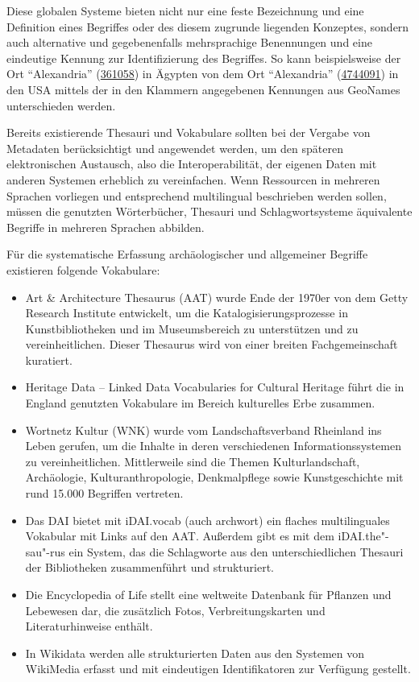 Diese globalen Systeme bieten nicht nur eine feste Bezeichnung und eine Definition eines Begriffes oder des diesem zugrunde liegenden Konzeptes, sondern auch alternative und gegebenenfalls mehrsprachige Benennungen und eine eindeutige Kennung zur Identifizierung des Begriffes. So kann beispielsweise der Ort "`Alexandria"' (\href{http://www.geonames.org/361058/alexandria.html}{361058}) in Ägypten von dem Ort "`Alexandria"' (\href{http://www.geonames.org/4744091/alexandria.html}{4744091}) in den USA mittels der in den Klammern angegebenen Kennungen aus GeoNames unterschieden werden.

Bereits existierende Thesauri und Vokabulare sollten bei der Vergabe von Metadaten berücksichtigt und angewendet werden, um den späteren elektronischen Austausch, also die Interoperabilität, der eigenen Daten mit anderen Systemen erheblich zu vereinfachen. Wenn Ressourcen in mehreren Sprachen vorliegen und entsprechend multilingual beschrieben werden sollen, müssen die genutzten Wörterbücher, Thesauri und Schlagwortsysteme äquivalente Begriffe in mehreren Sprachen abbilden.

Für die systematische Erfassung archäologischer und allgemeiner Begriffe existieren folgende Vokabulare:
\begin{itemize}
	\item Art \& Architecture Thesaurus (AAT) wurde Ende der 1970er von dem Getty Research Institute entwickelt, um die Katalogisierungsprozesse in Kunstbibliotheken und im Museumsbereich zu unterstützen und zu vereinheitlichen. Dieser Thesaurus wird von einer breiten Fachgemeinschaft kuratiert.
	\item Heritage Data -- Linked Data Vocabularies for Cultural Heritage führt die in England genutzten Vokabulare im Bereich kulturelles Erbe zusammen. 
	\item Wortnetz Kultur (WNK) wurde vom Landschaftsverband Rheinland ins Leben gerufen, um die Inhalte in deren verschiedenen Informationssystemen zu vereinheitlichen. Mittlerweile sind die Themen Kulturlandschaft, Archäologie, Kulturanthropologie, Denkmalpflege sowie Kunstgeschichte mit rund 15.000 Begriffen vertreten.
	\item Das DAI bietet mit iDAI.vocab (auch archwort) ein flaches multilinguales Vokabular mit Links auf den AAT. Außerdem gibt es mit dem iDAI.the"-sau"-rus ein System, das die Schlagworte aus den unterschiedlichen Thesauri der Bibliotheken zusammenführt und strukturiert.
	\item Die Encyclopedia of Life stellt eine weltweite Datenbank für Pflanzen und Lebewesen dar, die zusätzlich Fotos, Verbreitungskarten und Literaturhinweise enthält.
	\item In Wikidata werden alle strukturierten Daten aus den Systemen von WikiMedia erfasst und mit eindeutigen Identifikatoren zur Verfügung gestellt.
\end{itemize}

